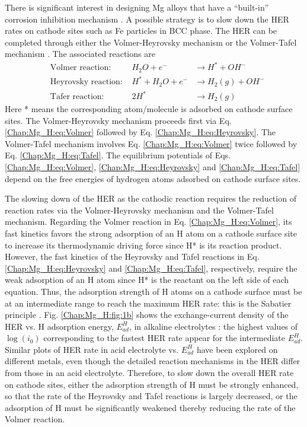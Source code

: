 There is significant interest in designing Mg alloys that have a “built-in” corrosion inhibition mechanism \cite{eaves2012inhibition}. A possible strategy is to slow down the HER rates on cathode sites such as Fe particles in \ac{BCC} phase. The HER can be completed through either the Volmer-Heyrovsky mechanism or the Volmer-Tafel mechanism \cite{ghali2010corrosion,walling1968electrochemical}. The associated reactions are
\begin{subequations}
\begin{align}
&\text{Volmer reaction:    } & H_2O + e^- & \rightarrow H^* + OH^-
 \label{Chap:Mg_H:eq:Volmer}\\
&\text{Heyrovsky reaction:    } & H^* + H_2O + e^- & \rightarrow H_2(g) + OH^-
 \label{Chap:Mg_H:eq:Heyrovsky}\\
&\text{Tafer reaction:    } 
& 2H^* & \rightarrow H_2(g)
 \label{Chap:Mg_H:eq:Tafel}
\end{align}
\end{subequations}
Here * means the corresponding atom/molecule is adsorbed on cathode surface sites. The Volmer-Heyrovsky mechanism proceeds first via Eq. \ref{Chap:Mg_H:eq:Volmer} followed by Eq. \ref{Chap:Mg_H:eq:Heyrovsky}. The Volmer-Tafel mechanism involves Eq. \ref{Chap:Mg_H:eq:Volmer} twice followed by Eq. \ref{Chap:Mg_H:eq:Tafel}. The equilibrium potentials of Eqs. \ref{Chap:Mg_H:eq:Volmer}, \ref{Chap:Mg_H:eq:Heyrovsky} and \ref{Chap:Mg_H:eq:Tafel} depend on the free energies of hydrogen atoms adsorbed on cathode surface sites. 

The slowing down of the HER as the cathodic reaction requires the reduction of reaction rates via the Volmer-Heyrovsky mechanism and the Volmer-Tafel mechanism. Regarding the Volmer reaction in Eq. \ref{Chap:Mg_H:eq:Volmer}, its fast kinetics favors the strong adsorption of an H atom on a cathode surface site to increase its thermodynamic driving force since H* is its reaction product. However, the fast kinetics of the Heyrovsky and Tafel reactions in Eq. \ref{Chap:Mg_H:eq:Heyrovsky} and \ref{Chap:Mg_H:eq:Tafel}, respectively, require the weak adsorption of an H atom since H* is the reactant on the left side of each equation. Thus, the adsorption strength of H atoms on a cathode surface must be at an intermediate range to reach the maximum \ac{HER} rate: this is the Sabatier principle \cite{medford2015sabatier}. Fig. \ref{Chap:Mg_H:fig:1b} shows the exchange-current density of the \ac{HER} vs. H adsorption energy, $E_{ad}^H$, in alkaline electrolytes \cite{sheng2013correlating}: the highest values of $\log(i_0)$ corresponding to the fastest \ac{HER} rate appear for the intermediate $E_{ad}^H$. Similar plots of \ac{HER} rate in acid electrolyte vs. $E_{ad}^H$ have been explored on different metals, even though the detailed reaction mechanisms in the \ac{HER} differ from those in an acid electrolyte. Therefore, to slow down the overall \ac{HER} rate on cathode sites, either the adsorption strength of H must be strongly enhanced, so that the rate of the Heyrovsky and Tafel reactions is largely decreased, or the adsorption of H must be significantly weakened thereby reducing the rate of the Volmer reaction. 

